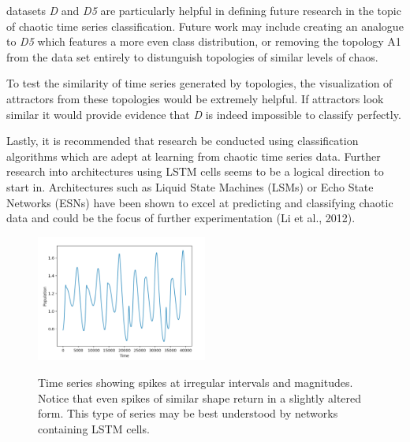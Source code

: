 \documentclass[letterpaper, 10 pt, conference]{ieeeconf}  %
\begin{document}
        datasets \textit{D} and \textit{D\textit{5}} are particularly helpful in defining future research in the topic of chaotic time series classification. Future work may include creating an analogue to \textit{D\textit{5}} which features a more even class distribution, or removing the topology A1 from the data set entirely to distunguish topologies of similar levels of chaos. 
        
        To test the similarity of time series generated by topologies, the visualization of attractors from these topologies would be extremely helpful. If attractors look similar it would provide evidence that \textit{D} is indeed impossible to classify perfectly. 
        
        Lastly, it is recommended that research be conducted using classification algorithms which are adept at learning from chaotic time series data. Further research into architectures using LSTM cells seems to be a logical direction to start in. Architectures such as Liquid State Machines (LSMs) or Echo State Networks (ESNs) have been shown to excel at predicting and classifying chaotic data and could be the focus of further experimentation (Li et al., 2012).
 
\begin{figure}
{\label{ref_label1}\includegraphics[width=0.5\textwidth]{dataspikes.png}}
   \caption{\label{ref_label_overall}Time series showing spikes at irregular intervals and magnitudes. Notice that even spikes of similar shape return in a slightly altered form. This type of series may be best understood by networks containing LSTM cells.}
\end{figure} 
\end{document}
